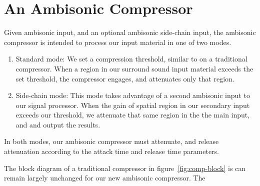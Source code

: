 \section{An Ambisonic Compressor}
\label{sec:ambis-compr}
Given ambisonic input, and an optional ambisonic side-chain input, 
the ambisonic compressor is intended to process our input material in
one of two modes.
\begin{enumerate}
\item Standard mode: We set a compression threshold, similar to on a
  traditional compressor. When a region in our surround sound input
  material exceeds the set threshold, the compressor engages, and
  attenuates only that region.
\item Side-chain mode: This mode takes advantage of a second ambisonic
  input to our signal processor. When the gain of spatial region in
  our secondary input exceeds our threshold, we attenuate that same
  region in the the main input, and and output the results.
\end{enumerate}
In both modes, our ambisonic compressor must attenuate, and release
attenuation according to the attack time and release time parameters.


The block diagram of a traditional compressor in
figure~\ref{fig:comp-block} is can remain largely unchanged for our
new ambisonic compressor. The 



